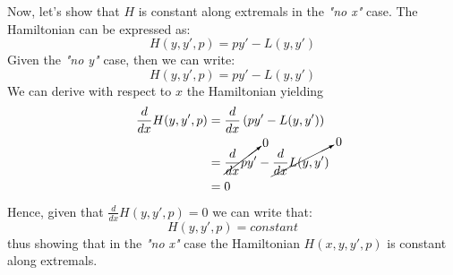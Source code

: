 Now, let's show that $H$ is constant along extremals in the \emph{"no x"} case. The Hamiltonian can be expressed as:
\begin{equation}
    H(y, y', p) = py' - L(y, y')
\end{equation}
Given the \emph{"no y"} case, then we can write:
\begin{equation}
    H(y, y', p) = py' - L(y, y')
\end{equation}
We can derive with respect to $x$ the Hamiltonian yielding
\begin{align}
    \frac{d}{dx} H (y, y', p)&= \frac{d}{dx} \left( py' - L(y, y') \right) \\
    &= \cancelto{0}{\frac{d}{dx} py'} - \cancelto{0}{\frac{d}{dx}L(y, y') }\\
    &= 0
\end{align}
Hence, given that $\frac{d}{dx} H (y, y', p) = 0$ we can write that:
\begin{equation}
    H (y, y', p) = constant
\end{equation}
thus showing that in the \emph{"no x"} case the Hamiltonian $H (x, y, y', p)$ is constant along extremals.\
\QEDB

